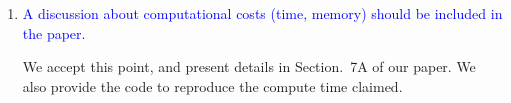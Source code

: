 \documentclass{article}
\begin{document}
\begin{enumerate}
\begin{comment}
  The reason for not reporting RMSE stems from the optimization
  process in Equation~\ref{Eq:simple_TV}.
  
 \begin{equation}
   J_{TV}(\boldsymbol{x}) = \lVert\boldsymbol{\mathcal{R}x}- \boldsymbol{y}\rVert_2^2 + \lambda_{TV}TV(\boldsymbol{x})
   \label{Eq:simple_TV}
 \end{equation}

  This optimization routine 
  transforms the reconstruction values to a different range of
  numerical values.  That is, in our experiments, we observed that for
  a given dataset and a set of projection measurements, the intensity
  span of histograms of reconstructed volumes differ considerably across various
  methods and solvers.  As a result, the RMSE values are not
  particularly useful, and may even be misleading.  We provide the RMSE numbers below to show the
  improvement trend but we believe it does not serve the interest of
  the community to report these in the main paper.

  For the same reason, the standard setting of SSIM in matlab (for
  instance) emphasizes the intensity. We found that even when the
  quality of reconstruction is acceptable visually, the SSIM values
  with the standard values were not acceptable.  We choose
  to focus on preserving the structures on our reconstructions, and
  not rely on the absolute intensity values alone. Hence, we choose
  SSIM with a higher weightage to structure-preservation.

  For the record, sample RMSE values are presented
  here in Table~\ref{table:rmse} that shows
  the superiority of our method at the risk of misleading absolute numbers.

\end{comment}

\item \textcolor{blue}{A discussion about computational costs (time,
  memory) should be included in the paper.}
  
We accept this point, and present details in Section.~7A of our paper.
We also provide the code to reproduce the compute time claimed.

\end{enumerate}

  
\end{document}
